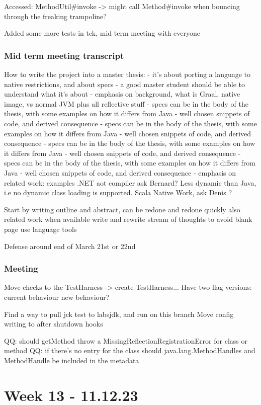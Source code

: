 Accessed:
MethodUtil\#invoke -> might call Method\#invoke when bouncing through the freaking trampoline?

Added some more tests in tck, mid term meeting with everyone

\subsubsection{Mid term meeting transcript}
How to write the project into a master thesis:
- it's about porting a language to native restrictions, and about specs
- a good master student should be able to understand what it's about
- emphasis on background, what is Graal, native image, vs normal JVM plus all reflective stuff
- specs can be in the body of the thesis, with some examples on how it differs from Java - well chosen snippets of code, and derived consequence
- specs can be in the body of the thesis, with some examples on how it differs from Java - well chosen snippets of code, and derived consequence
- specs can be in the body of the thesis, with some examples on how it differs from Java - well chosen snippets of code, and derived consequence
- specs can be in the body of the thesis, with some examples on how it differs from Java - well chosen snippets of code, and derived consequence
- emphasis on related work: examples .NET aot compiler ask Bernard? Less dynamic than Java, i.e no dynamic class loading is supported. Scala Native Work, ask Denis ?

Start by writing outline and abstract, can be redone and redone quickly
also related work when available
write and rewrite stream of thoughts to avoid blank page 
use language tools

Defense around end of March 21st or 22nd


\subsubsection{Meeting}
Move checks to the TestHarness -> create TestHarness...
Have two flag versions: current behaviour new behaviour?

Find a way to pull jck test to labsjdk, and run on this branch
Move config writing to after shutdown hooks

QQ: should getMethod throw a MissingReflectionRegistrationError for class or method QQ: if there's no entry for the class
should java.lang.MethodHandles and MethodHandle be included in the metadata

\section{Week 13 - 11.12.23}

